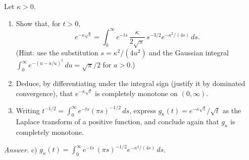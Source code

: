 \begin{exercise}
Let $\kappa>0$.
\begin{enumerate}
\item Show that, for $t>0$,
\[e^{-\kappa\sqrt t}=\int_0^\infty e^{-ts}\,\frac{\kappa}{2\sqrt\pi}\,s^{-3/2}e^{-\kappa^2/(4s)}\,ds .\]
(Hint: use the substitution $s=\kappa^2/(4u^2)$ and the Gaussian integral
$\int_0^\infty e^{-(u-a/u)^2}\,du=\sqrt\pi/2$ for $a>0$.)
\item Deduce, by differentiating under the integral sign (justify it by dominated convergence), that
$e^{-\kappa\sqrt t}$ is completely monotone on $(0,\infty)$.
\item Writing $t^{-1/2}=\int_0^\infty e^{-ts}(\pi s)^{-1/2}\,ds$, express $g_\kappa(t)=e^{-\kappa\sqrt t}/\sqrt t$ as
the Laplace transform of a positive function, and conclude again that $g_\kappa$ is completely monotone.
\end{enumerate}
\emph{Answer.} c) $g_\kappa(t)=\int_0^\infty e^{-ts}\,(\pi s)^{-1/2}e^{-\kappa^2/(4s)}\,ds$.
\end{exercise}

\label{ch5:fin}
